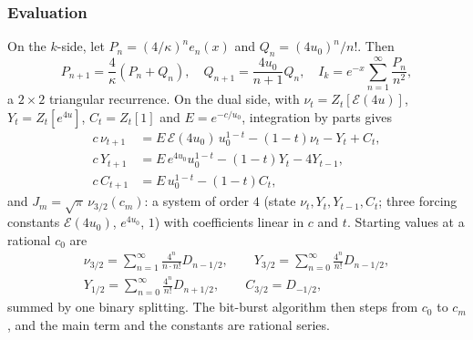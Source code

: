 \documentclass[11pt,reqno]{amsart}
\theoremstyle{definition}
\theoremstyle{remark}
\newcommand{\Eip}{\mathcal{E}}
\begin{document}
\subsubsection{Evaluation}
On the $k$-side, let $P_n = (4/\kappa)^ne_n(x)$ and $Q_n = (4u_0)^n/n!$. Then
\[
  P_{n+1} = \frac4\kappa(P_n + Q_n), \quad Q_{n+1} = \frac{4u_0}{n+1}Q_n, \quad I_k = e^{-x}\sum_{n=1}^{\infty}\frac{P_n}{n^2},
\]
a $2\times2$ triangular recurrence. On the dual side, with $\nu_t = Z_t[\Eip(4u)]$, $Y_t = Z_t[e^{4u}]$,
$C_t = Z_t[1]$ and $E = e^{-c/u_0}$, integration by parts gives
\begin{align*}
  c\,\nu_{t+1} &= E\,\Eip(4u_0)\,u_0^{1-t} - (1-t)\nu_t - Y_t + C_t, \\
  c\,Y_{t+1} &= E\,e^{4u_0}u_0^{1-t} - (1-t)Y_t - 4Y_{t-1}, \\
  c\,C_{t+1} &= E\,u_0^{1-t} - (1-t)C_t,
\end{align*}
and $J_m = \sqrt\pi\,\nu_{3/2}(c_m)$: a system of order $4$ (state $\nu_t, Y_t, Y_{t-1}, C_t$; three forcing constants
$\Eip(4u_0)$, $e^{4u_0}$, $1$) with coefficients linear in $c$ and $t$. Starting values at a rational $c_0$ are
\begin{gather*}
  \nu_{3/2} = \sum_{n=1}^{\infty}\frac{4^n}{n\cdot n!}D_{n-1/2}, \qquad Y_{3/2} = \sum_{n=0}^{\infty}\frac{4^n}{n!}D_{n-1/2}, \\
  Y_{1/2} = \sum_{n=0}^{\infty}\frac{4^n}{n!}D_{n+1/2}, \qquad C_{3/2} = D_{-1/2},
\end{gather*}
summed by one binary splitting. The bit-burst algorithm then steps from $c_0$ to $c_m$, and the main term and the
constants are rational series.
\end{document}
